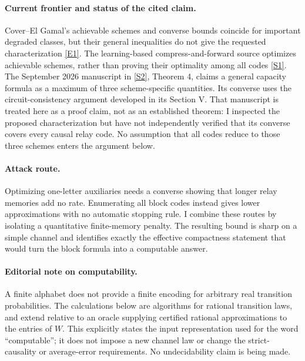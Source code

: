 \documentclass[11pt,a4paper]{article}
\newcommand{\sref}[2]{\hyperlink{source:#1:#2}{[S#2]}}
\newcommand{\eref}[2]{\hyperlink{extra:#1:#2}{[E#2]}}
\numberwithin{equation}{section}
\begin{document}
\paragraph{Current frontier and status of the cited claim.}
Cover--El Gamal's achievable schemes and converse bounds coincide for
important degraded classes, but their general inequalities do not give
the requested characterization \eref{30006765}{1}. The learning-based
compress-and-forward source optimizes achievable schemes, rather than
proving their optimality among all codes \sref{30006765}{1}. The September
2026 manuscript in \sref{30006765}{2}, Theorem 4, claims a general capacity
formula as a maximum of three scheme-specific quantities. Its converse
uses the circuit-consistency argument developed in its Section V.
That manuscript is treated here as a proof claim, not as an established
theorem: I inspected the proposed characterization but have not
independently verified that its converse covers every causal relay code.
No assumption that all codes reduce to those three schemes enters the
argument below.

\paragraph{Attack route.}
Optimizing one-letter auxiliaries needs a converse showing that longer
relay memories add no rate. Enumerating all block codes instead gives
lower approximations with no automatic stopping rule. I combine these
routes by isolating a quantitative finite-memory penalty. The resulting
bound is sharp on a simple channel and identifies exactly the effective
compactness statement that would turn the block formula into a
computable answer.

\paragraph{Editorial note on computability.}
A finite alphabet does not provide a finite encoding for arbitrary real
transition probabilities. The calculations below are algorithms for
rational transition laws, and extend relative to an oracle supplying
certified rational approximations to the entries of $W$. This explicitly
states the input representation used for the word ``computable''; it
does not impose a new channel law or change the strict-causality or
average-error requirements. No undecidability claim is being made.
\end{document}
